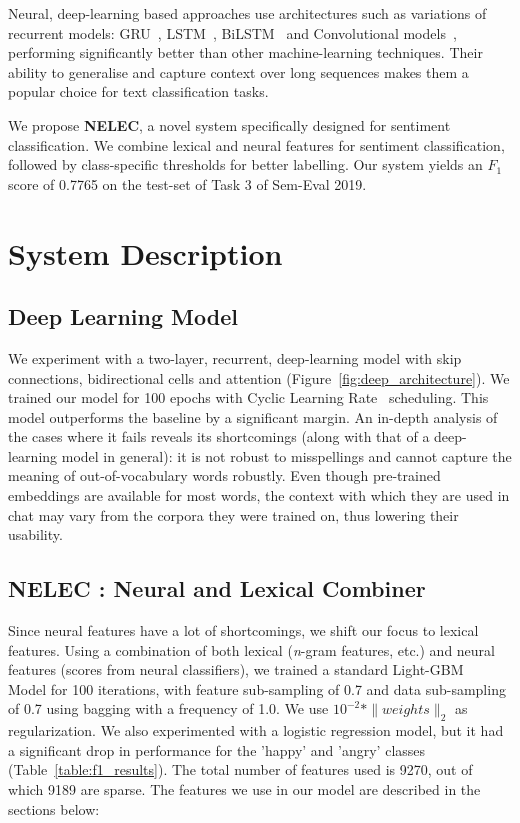 \documentclass[11pt,a4paper]{article}
\begin{document}
Neural, deep-learning based approaches use architectures such as variations of recurrent models: GRU~\cite{chung2014empirical}, LSTM~\cite{hochreiter1997long}, BiLSTM~\cite{schuster1997bidirectional} and Convolutional models~\cite{mundra2017fine}, performing significantly better than other machine-learning techniques. Their ability to generalise and capture context over long sequences makes them a popular choice for text classification tasks. \par
We propose \textbf{NELEC}, a novel system specifically designed for sentiment classification. We combine lexical and neural features for sentiment classification, followed by class-specific thresholds for better labelling. Our system yields an $F_{1}$ score of 0.7765 on the test-set of Task 3 of Sem-Eval 2019.

\section{System Description}

\subsection{Deep Learning Model} \label{deep_description}
We experiment with a two-layer, recurrent, deep-learning model with skip connections, bidirectional cells and attention (Figure~\ref{fig:deep_architecture}). We trained our model for 100 epochs with Cyclic Learning Rate~\cite{smith2017cyclical} scheduling. This model outperforms the baseline by a significant margin. An in-depth analysis of the cases where it fails reveals its shortcomings (along with that of a deep-learning model in general): it is not robust to misspellings and cannot capture the meaning of out-of-vocabulary words robustly. Even though pre-trained embeddings are available for most words, the context with which they are used in chat may vary from the corpora they were trained on, thus lowering their usability.
\subsection{NELEC : Neural and Lexical Combiner} \label{system_description}
Since neural features have a lot of shortcomings, we shift our focus to lexical features. Using a combination of both lexical (\textit{n}-gram features, etc.) and neural features (scores from neural classifiers), we trained a standard Light-GBM ~\cite{ke2017lightgbm} Model for 100 iterations, with feature sub-sampling of 0.7 and data sub-sampling of 0.7 using bagging with a frequency of 1.0. We use $10^{-2} * \|weights\|_{2}$ as regularization. We also experimented with a logistic regression model, but it had a significant drop in performance for the 'happy' and 'angry' classes (Table~\ref{table:f1_results}). The total number of features used is 9270, out of which 9189 are sparse. The features we use in our model are described in the sections below:
\end{document}
